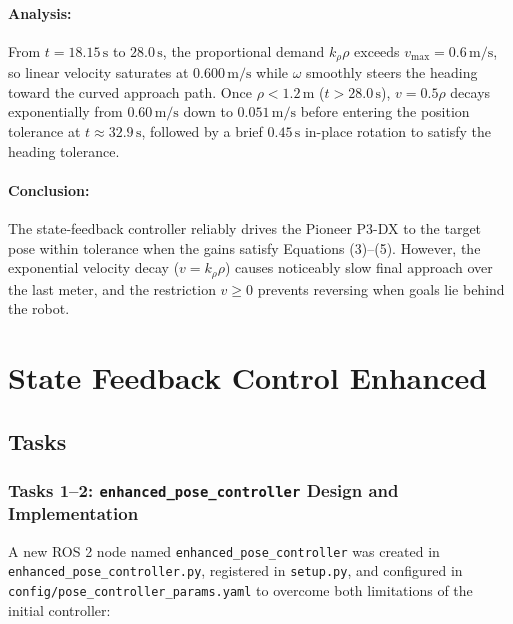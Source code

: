 \documentclass[11pt,a4paper]{article}
\begin{document}
\paragraph{Analysis:}
From $t = 18.15\,\text{s}$ to $28.0\,\text{s}$, the proportional demand $k_\rho \rho$ exceeds $v_{\max} = 0.6\,\text{m/s}$, so linear velocity saturates at $0.600\,\text{m/s}$ while $\omega$ smoothly steers the heading toward the curved approach path. Once $\rho < 1.2\,\text{m}$ ($t > 28.0\,\text{s}$), $v = 0.5\rho$ decays exponentially from $0.60\,\text{m/s}$ down to $0.051\,\text{m/s}$ before entering the position tolerance at $t \approx 32.9\,\text{s}$, followed by a brief $0.45\,\text{s}$ in-place rotation to satisfy the heading tolerance.

\paragraph{Conclusion:}
The state-feedback controller reliably drives the Pioneer P3-DX to the target pose within tolerance when the gains satisfy Equations (3)--(5). However, the exponential velocity decay ($v = k_\rho \rho$) causes noticeably slow final approach over the last meter, and the restriction $v \ge 0$ prevents reversing when goals lie behind the robot.

\newpage
\section{State Feedback Control Enhanced}
\subsection*{Tasks}

\subsubsection*{Tasks 1--2: \texttt{enhanced\_pose\_controller} Design and Implementation}
A new ROS 2 node named \texttt{enhanced\_pose\_controller} was created in \texttt{enhanced\_pose\_controller.py}, registered in \texttt{setup.py}, and configured in \texttt{config/pose\_controller\_params.yaml} to overcome both limitations of the initial controller:
\end{document}
